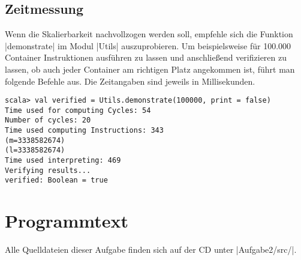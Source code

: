 \subsection{Zeitmessung}
Wenn die Skalierbarkeit nachvollzogen werden soll,
empfehle sich die Funktion |demonstrate| im Modul |Utils| auszuprobieren.
Um beispielsweise für 100.000 Container Instruktionen ausführen zu lassen und anschließend verifizieren zu lassen,
ob auch jeder Container am richtigen Platz angekommen ist, führt man folgende Befehle aus.
Die Zeitangaben sind jeweils in Millisekunden.
\begin{lstlisting}
scala> val verified = Utils.demonstrate(100000, print = false)
Time used for computing Cycles: 54
Number of cycles: 20
Time used computing Instructions: 343
(m=3338582674)
(l=3338582674)
Time used interpreting: 469
Verifying results...
verified: Boolean = true
\end{lstlisting}

\addtolength{\textheight}{2.08cm}
\lstset{xleftmargin=-0cm,xrightmargin=-.8cm}
\fontsize{8pt}{8.4pt}
\lstset{basicstyle=\ttfamily\small}
\clearpage
\setlength{\voffset}{-.68cm}
\setlength{\hoffset}{-.8cm}
\section{Programmtext}
\label{cod2}
Alle Quelldateien dieser Aufgabe finden sich auf der CD unter |Aufgabe2/src/|.
